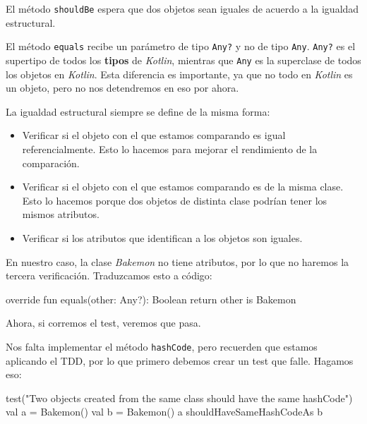   \begin{important}
    El método \texttt{shouldBe} espera que dos objetos sean iguales de acuerdo a la igualdad
    estructural.
  \end{important}

  \begin{note}
    El método \texttt{equals} recibe un parámetro de tipo \texttt{Any?} y no de tipo
    \texttt{Any}. 
    \texttt{Any?} es el supertipo de todos los \textbf{tipos} de \textit{Kotlin}, mientras que 
    \texttt{Any} es la superclase de todos los objetos en \textit{Kotlin}.
    Esta diferencia es importante, ya que no todo en \textit{Kotlin} es un objeto, pero no nos
    detendremos en eso por ahora.
  \end{note}

  La igualdad estructural siempre se define de la misma forma:

  \begin{itemize}
    \item Verificar si el objeto con el que estamos comparando es igual referencialmente.
      Esto lo hacemos para mejorar el rendimiento de la comparación.
    \item Verificar si el objeto con el que estamos comparando es de la misma clase.
      Esto lo hacemos porque dos objetos de distinta clase podrían tener los mismos atributos.
    \item Verificar si los atributos que identifican a los objetos son iguales.
  \end{itemize}

  En nuestro caso, la clase \textit{Bakemon} no tiene atributos, por lo que no haremos la tercera
  verificación.
  Traduzcamos esto a código:

  \begin{kotlin}
    override fun equals(other: Any?): Boolean {
      return other is Bakemon
    }
  \end{kotlin}

  Ahora, si corremos el test, veremos que pasa.

  Nos falta implementar el método \texttt{hashCode}, pero recuerden que estamos aplicando el TDD,
  por lo que primero debemos crear un test que falle.
  Hagamos eso:

  \begin{kotlin}
    test("Two objects created from the same class should have the same hashCode") {
      val a = Bakemon()
      val b = Bakemon()
      a shouldHaveSameHashCodeAs b
    }
  \end{kotlin}

